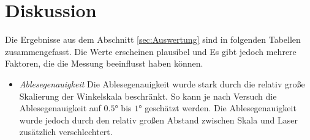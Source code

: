 \section{Diskussion}
\label{sec:Diskussion}
Die Ergebnisse aus dem Abschnitt \ref{sec:Auswertung} sind in folgenden Tabellen zusammengefasst.
Die Werte erscheinen plausibel und %
Es gibt jedoch mehrere Faktoren, die die Messung beeinflusst haben können.
\begin{itemize}
    \item \textit{Ablesegenauigkeit}
        Die Ablesegenauigkeit wurde stark durch die relativ große Skalierung der Winkelskala beschränkt.
        So kann je nach Versuch die Ablesegenauigkeit auf $\num{0.5}°$ bis $\num{1}°$ geschätzt werden.
        Die Ablesegenauigkeit wurde jedoch durch den relativ großen Abstand zwischen Skala und Laser
        zusätzlich verschlechtert.
\end{itemize}
